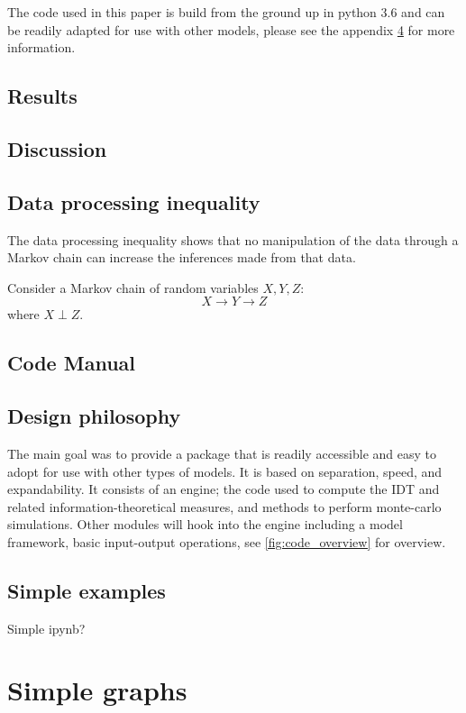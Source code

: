 \documentclass[twoside, twocolumn]{article}
\begin{document}
	The code used in this paper is build from the ground up in python 3.6 and can be readily adapted for use with other models, please see the appendix \ref{sec:code} for more information.

	\section{Results}

	\section{Discussion}
	\printbibliography
	\begin{appendices}
	\section{Data processing inequality}
	The data processing inequality shows that no manipulation of the data through a Markov chain can increase the inferences made from that data.

	Consider a Markov chain of random variables $X, Y, Z$:
	$$ X \rightarrow Y \rightarrow Z$$
	where $X \perp Z$.

	\section{Code Manual}
	\label{sec:code}
	\section{Design philosophy}
	The main goal was to provide a package that is readily accessible and easy to adopt for use with other types of models. It is based on separation, speed, and expandability. It consists of an engine; the code used to compute the IDT and related information-theoretical measures, and methods to perform monte-carlo simulations. Other modules will hook into the engine including a model framework, basic input-output operations, see \ref{fig:code_overview} for overview.

	\section{Simple examples}
	Simple ipynb?
	\chapter{Simple graphs}

	\end{appendices}
\end{document}
